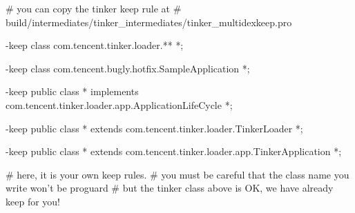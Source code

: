 # you can copy the tinker keep rule at
# build/intermediates/tinker_intermediates/tinker_multidexkeep.pro

-keep class com.tencent.tinker.loader.** {
    *;
}

-keep class com.tencent.bugly.hotfix.SampleApplication {
    *;
}

-keep public class * implements com.tencent.tinker.loader.app.ApplicationLifeCycle {
    *;
}

-keep public class * extends com.tencent.tinker.loader.TinkerLoader {
    *;
}

-keep public class * extends com.tencent.tinker.loader.app.TinkerApplication {
    *;
}

# here, it is your own keep rules.
# you must be careful that the class name you write won't be proguard
# but the tinker class above is OK, we have already keep for you!